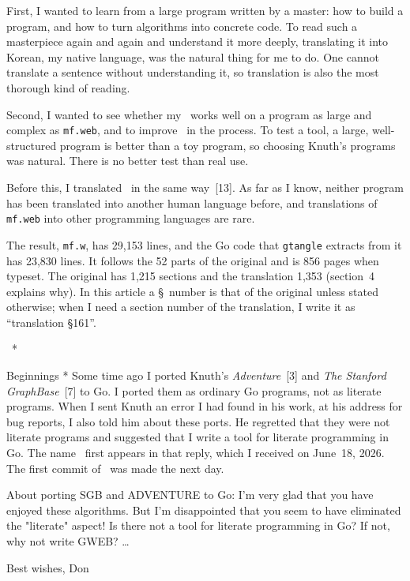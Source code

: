 First, I wanted to learn from a large program written by a master: how
to build a program, and how to turn algorithms into concrete code.
To read such a masterpiece again and again and understand it more deeply,
translating it into Korean,
my native language, was the natural thing for me to do. One cannot
translate a sentence without understanding it, so translation is also
the most thorough kind of reading.

Second, I wanted to see whether my \GWEB\ works well on a program as
large and complex as {\tt mf.web}, and to improve \GWEB\ in the
process. To test a tool, a large, well-structured program is better
than a toy program, so choosing Knuth's programs was natural. There is
no better test than real use.

Before this, I translated \TP\ in the same way~[13]. As far as I
know, neither program has been translated into another human language
before, and translations of {\tt mf.web} into other programming
languages are rare.

The result, {\tt mf.w}, has 29,153 lines, and the Go code that
{\tt gtangle} extracts from it has 23,830 lines. It follows the 52
parts of the original and is 856 pages when typeset. The original has
1,215 sections and the translation 1,353 (section~4 explains why). In
this article a \S\ number is that of the original unless stated
otherwise; when I need a section number of the translation, I write it
as ``translation \S161''.

\quad \GWEB\ *

\subhead * Beginnings *
Some time ago I ported Knuth's {\sl Adventure\/}~[3] and
{\sl The Stanford GraphBase\/}~[7] to Go. I ported them as ordinary Go
programs, not as literate programs. When I sent Knuth an error I had
found in his work, at his address for bug reports, I also told him
about these ports. He regretted that they were not literate programs
and suggested that I write a tool for literate programming in Go. The
name \GWEB\ first appears in that reply, which I received on June~18,
2026. The first commit of \GWEB\ was made the next day.

{\narrower\smallskip\noindent\ninepoint\tt\raggedright
About porting SGB and ADVENTURE to Go: I'm very glad that
you have enjoyed these algorithms. But I'm disappointed that you seem to have
eliminated the "literate" aspect! Is there not a tool for literate
programming in Go? If not, why not write GWEB? \dots\par\smallskip
\noindent Best wishes, Don\smallskip}

